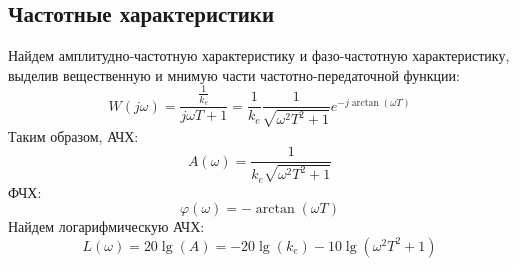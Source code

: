 \subsection{Частотные характеристики}
\noindent Найдем амплитудно-частотную характеристику и фазо-частотную характеристику,
выделив вещественную и мнимую части частотно-передаточной функции:
\begin{equation}
    W(j\omega) = \frac{\frac{1}{k_e}}{j\omega T + 1} = \frac{1}{k_e}\frac{1}{\sqrt{\omega^2T^2 + 1}}e^{-j\arctan(\omega T)}
\end{equation}
Таким образом, АЧХ:
\begin{equation}
    A(\omega) = \frac{1}{k_e\sqrt{\omega^2T^2 + 1}}
\end{equation}
ФЧХ:
\begin{equation}
    \varphi(\omega) = -\arctan(\omega T)
\end{equation}
Найдем логарифмическую АЧХ: 
\begin{equation}
    L(\omega) = 20\lg(A) = -20\lg(k_e) - 10\lg(\omega^2T^2 + 1)
\end{equation}

